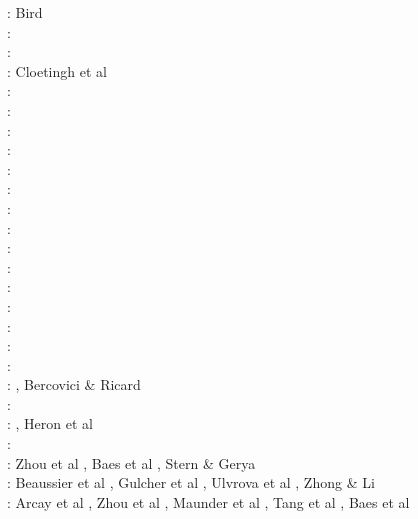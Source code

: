 \begin{scriptsize}
\nineteenseventyeight: Bird \cite{bird78}\\
\nineteeneightytwo: \cite{clwv82}\\
\nineteeneightyfour: \cite{cade84}\\
\nineteeneightynine: Cloetingh et al \cite{clwv89}\\
\nineteenninetyone: \cite{muph91}\\
\nineteenninetysix: \cite{kest96}\\
\nineteenninetyeight: \cite{togu98}\\
\nineteenninetynine: \cite{fagd99}\\
\twothousand: \cite{pybf00}\\
\twothousandone: \cite{dohe01}\cite{reyb01}\cite{brry01}\\
\twothousandfour: \cite{ster04}\cite{guhl04}\cite{solo04}\\
\twothousandthree: \cite{hags03}\\
\twothousandfive: \cite{bihi05}\\
\twothousandseven: \cite{kore07}\\
\twothousandeight: \cite{uegs08}\\
\twothousandten: \cite{nigm10}\cite{bucl10}\\
\twothousandeleven: \cite{bagw11}\cite{nigm11}\cite{legu11}\\
\twothousandtwelve: \cite{stri12}\cite{thka12}\cite{lega12}\cite{shch12}\\
\twothousandthirteen: \cite{dyge13}\cite{mana13}\cite{kore13}\cite{mibg13}\\
\twothousandfourteen: \cite{recf14}\cite{macg14}\cite{crta14}, Bercovici \& Ricard \cite{beri14}\\
\twothousandfifteen: \cite{matv15}\cite{pebu15}\cite{vapm15}\cite{legu15}\cite{gesb15}\\
\twothousandsixteen: \cite{crta16}\cite{maka16}\cite{bags16}, Heron et al \cite{heps16}\\
\twothousandseventeen: \cite{magm17}\\
\twothousandeighteen: Zhou et al \cite{zhlg18}, Baes et al \cite{basq18}, Stern \& Gerya \cite{stge18} \\
\twothousandnineteen: Beaussier et al \cite{begb19}, Gulcher et al \cite{gubg19}, 
Ulvrova et al \cite{ulcw19}, Zhong \& Li \cite{zhli19}\\
\twothousandtwenty: Arcay et al \cite{arla20}, Zhou et al \cite{zhlg20}, Maunder et al \cite{mapg20}, 
Tang et al \cite{tawm20}, Baes et al \cite{basg20b}
\end{scriptsize}

